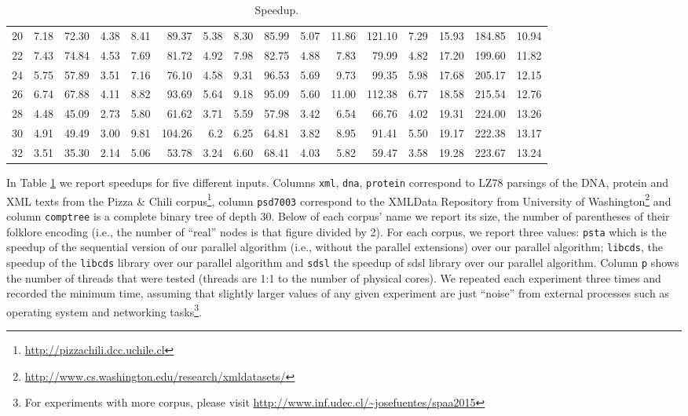 \begin{table}[ht]
\begin{tabular}{crrrrrrrrrrrrrrr}
 20  &  7.18 &  72.30 & 4.38 &  8.41 & 89.37  & 5.38 &  8.30  & 85.99  & 5.07 &  11.86 &  121.10 &  7.29  & 15.93 & 184.85 & 10.94\\
 22  &  7.43 &  74.84 & 4.53 &  7.69 & 81.72  & 4.92 &  7.98  & 82.75  & 4.88 &  7.83  &  79.99  &  4.82  & 17.20 & 199.60 & 11.82\\
 24  &  5.75 &  57.89 & 3.51 &  7.16 & 76.10  & 4.58 &  9.31  & 96.53  & 5.69 &  9.73  &  99.35  &  5.98  & 17.68 & 205.17 & 12.15\\
 26  &  6.74 &  67.88 & 4.11 &  8.82 & 93.69  & 5.64 &  9.18  & 95.09  & 5.60 &  11.00 &  112.38 &  6.77  & 18.58 & 215.54 & 12.76\\
 28  &  4.48 &  45.09 & 2.73 &  5.80 & 61.62  & 3.71 &  5.59  & 57.98  & 3.42 &  6.54  &  66.76  &  4.02  & 19.31 & 224.00 & 13.26\\
 30  &  4.91 &  49.49 & 3.00 &  9.81 & 104.26 & 6.2  &  6.25  & 64.81  & 3.82 &  8.95  &  91.41  &  5.50  & 19.17 & 222.38 & 13.17\\
 32  &  3.51 &  35.30 & 2.14 &  5.06 & 53.78  & 3.24 &  6.60  & 68.41  & 4.03 &  5.82  &  59.47  &  3.58  & 19.28 & 223.67 & 13.24\\
 \hline
\end{tabular}
\caption{Speedup.}
\label{tbl:speedup}
\end{table}


In Table \ref{tbl:speedup} we report speedups for five different
inputs. Columns \verb+xml+, \verb+dna+, \verb+protein+ correspond to
LZ78 parsings of the DNA, protein and XML texts from the Pizza \&
Chili corpus\footnote{\url{http://pizzachili.dcc.uchile.cl}}, column
\verb+psd7003+ correspond to the XMLData Repository from University of
Washington\footnote{\url{http://www.cs.washington.edu/research/xmldatasets/}}
and column \verb+comptree+ is a complete binary tree of depth
30. Below of each corpus' name we report its size, the number of
parentheses of their folklore encoding (i.e., the number of ``real''
nodes is that figure divided by 2). For each corpus, we report three
values: \verb+psta+ which is the speedup of the sequential version of
our parallel algorithm (i.e., without the parallel extensions) over
our parallel algorithm; \verb+libcds+, the speedup of the
\verb+libcds+ library over our parallel algorithm and \verb+sdsl+ the
speedup of sdsl library over our parallel algorithm. Column \verb+p+
shows the number of threads that were tested (threads are 1:1 to the
number of physical cores). We repeated each experiment three times and
recorded the minimum time, assuming that slightly larger values of any
given experiment are just ``noise'' from external processes such as
operating system and networking tasks\footnote{For experiments with
  more corpus, please visit
  \url{http://www.inf.udec.cl/~josefuentes/spaa2015}}.

